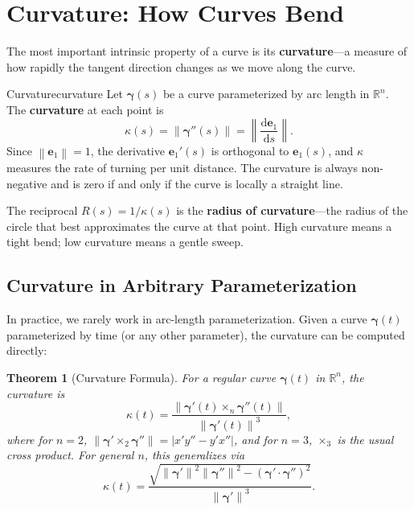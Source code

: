 \documentclass[12pt, openany]{book}
\theoremstyle{plain}
\newtheorem{theorem}{Theorem}[chapter]
\newcommand{\traj}{\bm{\gamma}}
\newcommand{\Reals}{\mathbb{R}}
\newcommand{\dd}{\mathrm{d}}
\newcommand{\norm}[1]{\left\lVert #1 \right\rVert}
\newcommand{\tangent}{\bm{e}_1}
\begin{document}
\section{Curvature: How Curves Bend}

The most important intrinsic property of a curve is its \textbf{curvature}---a
measure of how rapidly the tangent direction changes as we move along the curve.

\begin{definition}{Curvature}{curvature}
  Let $\traj(s)$ be a curve parameterized by arc length in $\Reals^n$. The
  \textbf{curvature} at each point is
  \begin{equation}\label{eq:curvature_def}
    \kappa(s) = \norm{\traj''(s)} = \norm{\frac{\dd\tangent}{\dd s}}.
  \end{equation}
  Since $\norm{\tangent} = 1$, the derivative $\tangent'(s)$ is orthogonal to
  $\tangent(s)$, and $\kappa$ measures the rate of turning per unit distance.
  The curvature is always non-negative and is zero if and only if the curve is
  locally a straight line.
\end{definition}

The reciprocal $R(s) = 1/\kappa(s)$ is the \textbf{radius of curvature}---the
radius of the circle that best approximates the curve at that point. High curvature
means a tight bend; low curvature means a gentle sweep.

\subsection{Curvature in Arbitrary Parameterization}

In practice, we rarely work in arc-length parameterization. Given a curve
$\traj(t)$ parameterized by time (or any other parameter), the curvature can
be computed directly:

\begin{theorem}[Curvature Formula]\label{thm:curvature_formula}
  For a regular curve $\traj(t)$ in $\Reals^n$, the curvature is
  \begin{equation}\label{eq:curvature_general}
    \kappa(t) = \frac{\norm{\traj'(t) \times_n \traj''(t)}}{\norm{\traj'(t)}^3},
  \end{equation}
  where for $n = 2$, $\norm{\traj' \times_2 \traj''} = |x'y'' - y'x''|$,
  and for $n = 3$, $\times_3$ is the usual cross product. For general $n$,
  this generalizes via
  \begin{equation}\label{eq:curvature_general_n}
    \kappa(t) = \frac{\sqrt{\norm{\traj'}^2 \norm{\traj''}^2
    - (\traj' \cdot \traj'')^2}}{\norm{\traj'}^3}.
  \end{equation}
\end{theorem}
\end{document}
